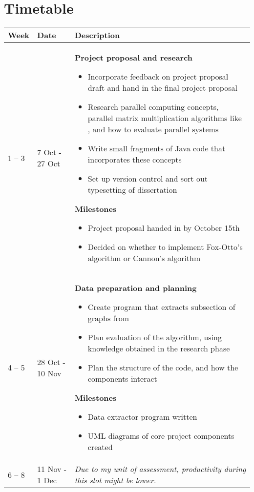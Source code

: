 \documentclass{article}
\begin{document}
\section*{Timetable}%
\label{sec:Timetable}


\begin{longtable}{m{40pt}m{75pt}m{265pt}}
    \hline
    \hline
    \textbf{Week} & \textbf{Date} & \textbf{Description} \\
    \hline
    1 -- 3 & 7 Oct - 27 Oct & %
    \textbf{Project proposal and research}
    \begin{itemize}
        \item Incorporate feedback on project proposal draft and hand in the
            final project proposal
        \item Research parallel computing concepts, parallel matrix
            multiplication algorithms like \cite{fox, cannon}, and how to evaluate
            parallel systems
        \item Write small fragments of Java code that incorporates these concepts
        \item Set up version control and sort out typesetting of dissertation
    \end{itemize}
    \textbf{Milestones}
    \begin{itemize}
        \item Project proposal handed in by October 15th
        \item Decided on whether to implement Fox-Otto's algorithm or Cannon's algorithm
    \end{itemize} \\
    \hline
    4 -- 5 & 28 Oct - 10 Nov & %
    \textbf{Data preparation and planning}
    \begin{itemize}
        \item Create program that extracts subsection of graphs from \cite{road-data}
        \item Plan evaluation of the algorithm, using knowledge obtained in the research
            phase
        \item Plan the structure of the code, and how the components interact
    \end{itemize}
    \textbf{Milestones}
    \begin{itemize}
        \item Data extractor program written
        \item UML diagrams of core project components created
    \end{itemize} \\
    \hline
    6 -- 8 & 11 Nov - 1 Dec & %
    \textit{Due to my unit of assessment, productivity during this slot might be lower.}


\end{longtable}
\end{document}
